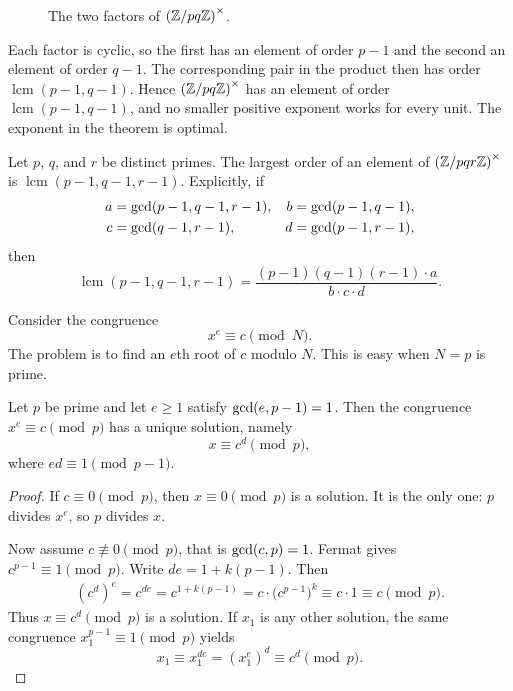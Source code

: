 \begin{figure}[H]
\centering
{}
\caption{The two factors of \(\left(\mathbb Z/pq\mathbb Z\right)^\times\).}
\end{figure}

Each factor is cyclic, so the first has an element of order \(p-1\) and the second an element of order \(q-1\). The corresponding pair in the product then has order \(\operatorname{lcm}(p-1,q-1)\). Hence \(\left(\mathbb Z/pq\mathbb Z\right)^\times\) has an element of order \(\operatorname{lcm}(p-1,q-1)\), and no smaller positive exponent works for every unit. The exponent in the theorem is optimal.

\begin{remark}
Let \(p\), \(q\), and \(r\) be distinct primes. The largest order of an element of \(\left(\mathbb Z/pqr\mathbb Z\right)^\times\) is \(\operatorname{lcm}(p-1,q-1,r-1)\). Explicitly, if
\begin{align*}
    a&=\operatorname{gcd}(p-1,q-1,r-1),&
    b&=\operatorname{gcd}(p-1,q-1),\\
    c&=\operatorname{gcd}(q-1,r-1),&
    d&=\operatorname{gcd}(p-1,r-1),
\end{align*}
then
\[
    \operatorname{lcm}(p-1,q-1,r-1)
    =\frac{(p-1)(q-1)(r-1)\cdot a}{b\cdot c\cdot d}.
\]
\end{remark}


Consider the congruence
\[
    x^{e}\equiv c\pmod{N}.
\]
The problem is to find an \(e\)th root of \(c\) modulo \(N\). This is easy when \(N=p\) is prime.


\begin{proposition}
Let \(p\) be prime and let \(e\ge 1\) satisfy \(\operatorname{gcd}(e,p-1)=1\). Then the congruence \(x^{e}\equiv c\pmod{p}\) has a unique solution, namely
\[
    x\equiv c^{d}\pmod{p},
\]
where \(ed\equiv 1\pmod{p-1}\).
\end{proposition}

\begin{proof}
If \(c\equiv 0\pmod{p}\), then \(x\equiv 0\pmod{p}\) is a solution. It is the only one: \(p\) divides \(x^{e}\), so \(p\) divides \(x\).

Now assume \(c\not\equiv 0\pmod{p}\), that is \(\operatorname{gcd}(c,p)=1\). Fermat gives \(c^{p-1}\equiv 1\pmod{p}\). Write \(de=1+k(p-1)\). Then
\begin{align*}
    (c^{d})^{e}
    =c^{de}
    =c^{1+k(p-1)}
    =c\cdot\bigl(c^{p-1}\bigr)^{k}
    \equiv c\cdot 1
    \equiv c\pmod{p}.
\end{align*}
Thus \(x\equiv c^{d}\pmod{p}\) is a solution. If \(x_{1}\) is any other solution, the same congruence \(x_{1}^{p-1}\equiv 1\pmod{p}\) yields
\[
    x_{1}
    \equiv x_{1}^{de}
    =(x_{1}^{e})^{d}
    \equiv c^{d}\pmod{p}.
\]
\end{proof}

